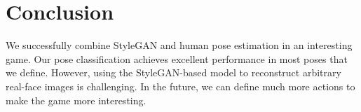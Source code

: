 \section{Conclusion}
We successfully combine StyleGAN and human pose estimation in an interesting game. Our pose classification achieves excellent performance in most poses that we define. However, using the StyleGAN-based model to reconstruct arbitrary real-face images is challenging. In the future, we can define much more actions to make the game more interesting.